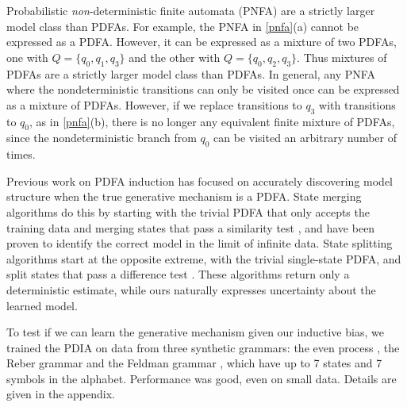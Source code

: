 Probabilistic {\em non}-deterministic finite automata (PNFA) are a strictly larger model class than PDFAs.  For example, the PNFA in \ref{pnfa}(a) cannot be expressed as a PDFA.  However, it can be expressed as a mixture of two PDFAs, one with $Q = \{q_0,q_1,q_3\}$ and the other with $Q = \{q_0,q_2,q_3\}$.  Thus mixtures of PDFAs are a strictly larger model class than PDFAs.  In general, any PNFA where the nondeterministic transitions can only be visited once can be expressed as a mixture of PDFAs.  However, if we replace transitions to $q_3$ with transitions to $q_0$, as in \ref{pnfa}(b), there is no longer any equivalent finite mixture of PDFAs, since the nondeterministic branch from $q_0$ can be visited an arbitrary number of times.    


Previous work on PDFA induction has focused on accurately discovering model structure when the true generative mechanism is a PDFA.  State merging algorithms do this by starting with the trivial PDFA that only accepts the training data and merging states that pass a similarity test \cite{Carrasco1994,Thollard2000}, and have been proven to identify the correct model in the limit of infinite data.  State splitting algorithms start at the opposite extreme, with the trivial single-state PDFA, and split states that pass a difference test \cite{Ron1996,Shalizi2004}.  These algorithms return only a deterministic estimate, while ours naturally expresses uncertainty about the learned model.

To test if we can learn the generative mechanism given our inductive bias, we trained the PDIA on data from three synthetic grammars: the even process \cite{Shalizi2004}, the Reber grammar \cite{Reber1967} and the Feldman grammar \cite{Feldman1966}, which have up to 7 states and 7 symbols in the alphabet.  Performance was good, even on small data.  Details are given in the appendix.



